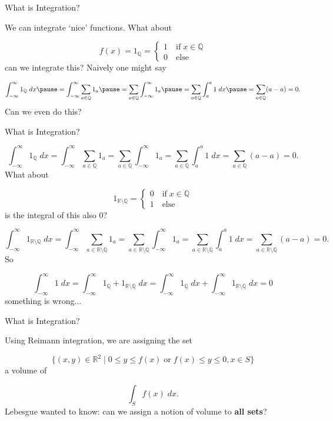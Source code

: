 \documentclass[9pt]{beamer}
\begin{document}
    \begin{frame}{What is Integration?}

        We can integrate `nice' functions.
        What about

        \[f(x)=1_\mathbb{Q}=\begin{cases}
            1\quad\text{if}\;x\in\mathbb{Q}\\
            0\quad\text{else}
        \end{cases}\]
        can we integrate this? \pause
        Naively one might say

        \[\int_{-\infty}^\infty 1_\mathbb{Q}\;dx\pause=\int_{-\infty}^\infty \sum_{a\in\mathbb{Q}} 1_a\pause=\sum_{a\in\mathbb{Q}}\int_{-\infty}^\infty 1_a\pause=\sum_{a\in\mathbb{Q}} \int_a^a 1\;dx\pause=\sum_{a\in\mathbb{Q}} (a-a)=0.\]\pause
        Can we even do this?
        
    \end{frame}

    \begin{frame}{What is Integration?}
    
        \[\int_{-\infty}^\infty 1_\mathbb{Q}\;dx=\int_{-\infty}^\infty \sum_{a\in\mathbb{Q}} 1_a=\sum_{a\in\mathbb{Q}}\int_{-\infty}^\infty 1_a=\sum_{a\in\mathbb{Q}} \int_a^a 1\;dx=\sum_{a\in\mathbb{Q}} (a-a)=0.\]
        What about

        \[1_{\mathbb{R}\setminus\mathbb{Q}}=\begin{cases}
            0\quad\text{if}\;x\in\mathbb{Q}\\
            1\quad\text{else}
        \end{cases}\]
        is the integral of this also $0$?\pause

        \[\int_{-\infty}^\infty 1_{\mathbb{R}\setminus\mathbb{Q}}\;dx=\int_{-\infty}^\infty \sum_{a\in\mathbb{R}\setminus\mathbb{Q}} 1_a=\sum_{a\in\mathbb{R}\setminus\mathbb{Q}}\int_{-\infty}^\infty 1_a=\sum_{a\in\mathbb{R}\setminus\mathbb{Q}} \int_a^a 1\;dx=\sum_{a\in\mathbb{R}\setminus\mathbb{Q}} (a-a)=0.\]\pause
        So

        \[\int_{-\infty}^\infty 1\;dx=\int_{-\infty}^\infty 1_\mathbb{Q}+1_{\mathbb{R}\setminus\mathbb{Q}}\;dx=\int_{-\infty}^\infty 1_\mathbb{Q}\;dx+\int_{-\infty}^\infty 1_{\mathbb{R}\setminus\mathbb{Q}}\;dx=0\]
        something is wrong...

    \end{frame}

    \begin{frame}{What is Integration?}

        \pause

        Using Reimann integration, we are assigning the set

        \[\{(x, y)\in\mathbb{R}^2\;|\;0\leq y\leq f(x)\;\text{or}\;f(x)\leq y\leq 0, x\in S\}\]
        a volume of
        
        \[\int_S f(x)\;dx.\]\pause
        Lebesgue wanted to know: can we assign a notion of volume to \textbf{all sets}?

    \end{frame}
\end{document}
